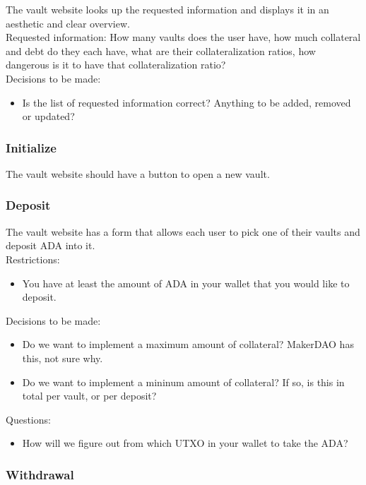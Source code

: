\documentclass{article} %
\begin{document}
The vault website looks up the requested information and displays it in an
aesthetic and clear overview. \\

Requested information: How many vaults does the user have, how much collateral
and debt do they each have, what are their collateralization ratios, how
dangerous is it to have that collateralization ratio? \\

Decisions to be made:
\begin{itemize}
  \item Is the list of requested information correct? Anything to be added,
    removed or updated?
\end{itemize}

\subsubsection{Initialize}

The vault website should have a button to open a new vault.

\subsubsection{Deposit}

The vault website has a form that allows each user to pick one of their vaults
and deposit ADA into it. \\

Restrictions:
\begin{itemize}
  \item You have at least the amount of ADA in your wallet that you would like
    to deposit.
\end{itemize}

Decisions to be made:
\begin{itemize}
  \item Do we want to implement a maximum amount of collateral? MakerDAO has
    this, not sure why.
  \item Do we want to implement a mininum amount of collateral? If so, is this
    in total per vault, or per deposit?
\end{itemize}

Questions:
\begin{itemize}
  \item How will we figure out from which UTXO in your wallet to take the ADA?
\end{itemize}

\subsubsection{Withdrawal}
\end{document}
